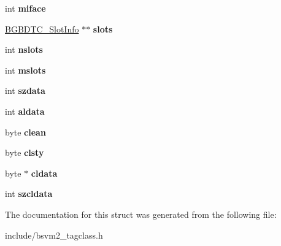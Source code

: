 \begin{DoxyCompactItemize}
\item 
\hypertarget{structBGBDTC__ClassInfo__s_a32bdc09a918b908acf9da1cb6958846e}{int {\bfseries miface}}\label{structBGBDTC__ClassInfo__s_a32bdc09a918b908acf9da1cb6958846e}

\item 
\hypertarget{structBGBDTC__ClassInfo__s_a37bfd97b8920a796a4c92caecca9aeb3}{\hyperlink{structBGBDTC__SlotInfo__s}{B\-G\-B\-D\-T\-C\-\_\-\-Slot\-Info} $\ast$$\ast$ {\bfseries slots}}\label{structBGBDTC__ClassInfo__s_a37bfd97b8920a796a4c92caecca9aeb3}

\item 
\hypertarget{structBGBDTC__ClassInfo__s_a8171b48f857c3964cf207bf02185b0de}{int {\bfseries nslots}}\label{structBGBDTC__ClassInfo__s_a8171b48f857c3964cf207bf02185b0de}

\item 
\hypertarget{structBGBDTC__ClassInfo__s_a55ae492e0dcdb44c976fd0bcf676b921}{int {\bfseries mslots}}\label{structBGBDTC__ClassInfo__s_a55ae492e0dcdb44c976fd0bcf676b921}

\item 
\hypertarget{structBGBDTC__ClassInfo__s_a5d21ab79e1b3956391ef27aa4129de8e}{int {\bfseries szdata}}\label{structBGBDTC__ClassInfo__s_a5d21ab79e1b3956391ef27aa4129de8e}

\item 
\hypertarget{structBGBDTC__ClassInfo__s_a199ce1214e79f886389b60e152a03a70}{int {\bfseries aldata}}\label{structBGBDTC__ClassInfo__s_a199ce1214e79f886389b60e152a03a70}

\item 
\hypertarget{structBGBDTC__ClassInfo__s_afd50296a3ef35cf3ca1696bea7c0f7cf}{byte {\bfseries clean}}\label{structBGBDTC__ClassInfo__s_afd50296a3ef35cf3ca1696bea7c0f7cf}

\item 
\hypertarget{structBGBDTC__ClassInfo__s_adbbbbdcc14a68ccf87c736d232acefdf}{byte {\bfseries clsty}}\label{structBGBDTC__ClassInfo__s_adbbbbdcc14a68ccf87c736d232acefdf}

\item 
\hypertarget{structBGBDTC__ClassInfo__s_a3008c6fb014a46f4eb36429603af7d76}{byte $\ast$ {\bfseries cldata}}\label{structBGBDTC__ClassInfo__s_a3008c6fb014a46f4eb36429603af7d76}

\item 
\hypertarget{structBGBDTC__ClassInfo__s_afda14a9de1f5bf9c92d7ac34274433f1}{int {\bfseries szcldata}}\label{structBGBDTC__ClassInfo__s_afda14a9de1f5bf9c92d7ac34274433f1}

\end{DoxyCompactItemize}


The documentation for this struct was generated from the following file\-:\begin{DoxyCompactItemize}
\item 
include/bsvm2\-\_\-tagclass.\-h\end{DoxyCompactItemize}
